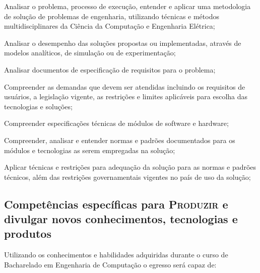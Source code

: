 \begin{compitem}
    \item Analisar o problema, processo de execução, entender e aplicar uma metodologia de solução de problemas de engenharia, utilizando técnicas e métodos multidisciplinares da Ciência da Computação e Engenharia Elétrica;
    \item Analisar o desempenho das soluções propostas ou implementadas, através de modelos analíticos, de simulação ou de experimentação;
    \item Analisar documentos de especificação de requisitos para o problema;
    \item Compreender as demandas que devem ser atendidas incluindo os requisitos de usuários, a legislação vigente, as restrições e limites aplicáveis para escolha das tecnologias e soluções;
    \item Compreender especificações técnicas de módulos de software e hardware;
    \item Compreender, analisar e entender normas e padrões documentados para os módulos e tecnologias as serem empregadas na solução;
    \item Aplicar técnicas e restrições para adequação da solução para as normas e padrões técnicos, além das restrições governamentais vigentes no país de uso da solução;
\end{compitem}

\subsection*{Competências específicas para \textsc{Produzir} e divulgar novos conhecimentos, tecnologias e produtos}

Utilizando os conhecimentos e habilidades adquiridas durante o curso de Bacharelado em Engenharia de Computação o egresso será capaz de:

